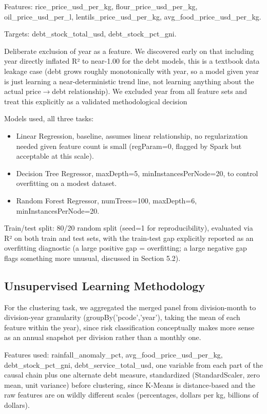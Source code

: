 \documentclass[12pt,a4paper]{article}
\begin{document}
Features: rice\_price\_usd\_per\_kg, flour\_price\_usd\_per\_kg, oil\_price\_usd\_per\_l, lentils\_price\_usd\_per\_kg, avg\_food\_price\_usd\_per\_kg.

Targets: debt\_stock\_total\_usd, debt\_stock\_pct\_gni.

Deliberate exclusion of year as a feature. We discovered early on that including year directly inflated R² to near-1.00 for the debt models, this is a textbook data leakage case (debt grows roughly monotonically with year, so a model given year is just learning a near-deterministic trend line, not learning anything about the actual price$\rightarrow$debt relationship). We excluded year from all feature sets and treat this explicitly as a validated methodological decision

Models used, all three tasks:
\begin{itemize}[leftmargin=2em]
  \item Linear Regression, baseline, assumes linear relationship, no regularization needed given feature count is small (regParam=0, flagged by Spark but acceptable at this scale).
  \item Decision Tree Regressor, maxDepth=5, minInstancesPerNode=20, to control overfitting on a modest dataset.
  \item Random Forest Regressor, numTrees=100, maxDepth=6, minInstancesPerNode=20.
\end{itemize}

Train/test split: 80/20 random split (seed=1 for reproducibility), evaluated via R² on both train and test sets, with the train-test gap explicitly reported as an overfitting diagnostic (a large positive gap = overfitting; a large negative gap flags something more unusual, discussed in Section 5.2).


\subsection{Unsupervised Learning Methodology}

For the clustering task, we aggregated the merged panel from division-month to division-year granularity (groupBy('pcode','year'), taking the mean of each feature within the year), since risk classification conceptually makes more sense as an annual snapshot per division rather than a monthly one.

Features used: rainfall\_anomaly\_pct, avg\_food\_price\_usd\_per\_kg, debt\_stock\_pct\_gni, debt\_service\_total\_usd, one variable from each part of the causal chain plus one alternate debt measure, standardized (StandardScaler, zero mean, unit variance) before clustering, since K-Means is distance-based and the raw features are on wildly different scales (percentages, dollars per kg, billions of dollars).
\end{document}

